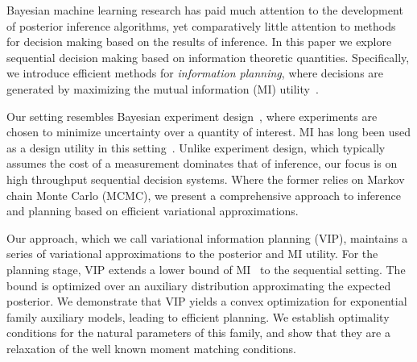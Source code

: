 Bayesian machine learning research has paid much attention to the
development of posterior inference algorithms, yet comparatively
little attention to methods for decision making based on the results
of inference.  In this paper we explore sequential decision making
based on information theoretic quantities.  Specifically, we introduce
efficient methods for \emph{information planning}, where decisions are
generated by maximizing the mutual information (MI)
utility~\citep{WilliamsThesis}.

Our setting resembles Bayesian experiment design~\citep{lindley56},
where experiments are chosen to minimize uncertainty over a quantity
of interest.  MI has long been used as a design utility in this
setting~\citep{blackwell50, bernardo79a}.  Unlike experiment design,
which typically assumes the cost of a measurement dominates that of
inference, our focus is on high throughput sequential decision
systems.  Where the former relies on Markov chain Monte Carlo (MCMC),
we present a comprehensive approach to inference and planning based on
efficient variational approximations.

Our approach, which we call variational information planning (VIP),
maintains a series of variational approximations to the posterior and
MI utility.  For the planning stage, VIP extends a lower bound of
MI~\citep{agakov2004algorithm} to the sequential setting.  The bound
is optimized over an auxiliary distribution approximating the expected
posterior.  We demonstrate that VIP yields a convex optimization for
exponential family auxiliary models, leading to efficient planning.
We establish optimality conditions for the natural parameters of this
family, and show that they are a relaxation of the well known moment
matching conditions.


